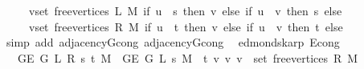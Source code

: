 \begin{isabellebody}
\ \ \ \ \ {\isacharparenleft}{\kern0pt}{\isasymUnion}v{\isasymin}set\ {\isacharparenleft}{\kern0pt}free{\isacharunderscore}{\kern0pt}vertices\ L\ M{\isacharparenright}{\kern0pt}{\isachardot}{\kern0pt}\ if\ u\ {\isacharequal}{\kern0pt}\ s\ then\ {\isacharbraceleft}{\kern0pt}v{\isacharbraceright}{\kern0pt}\ else\ if\ u\ {\isacharequal}{\kern0pt}\ v\ then\ {\isacharbraceleft}{\kern0pt}s{\isacharbraceright}{\kern0pt}\ else\ {\isacharbraceleft}{\kern0pt}{\isacharbraceright}{\kern0pt}{\isacharparenright}{\kern0pt}\ {\isasymunion}\isanewline
\ \ \ \ \ {\isacharparenleft}{\kern0pt}{\isasymUnion}v{\isasymin}set\ {\isacharparenleft}{\kern0pt}free{\isacharunderscore}{\kern0pt}vertices\ R\ M{\isacharparenright}{\kern0pt}{\isachardot}{\kern0pt}\ if\ u\ {\isacharequal}{\kern0pt}\ t\ then\ {\isacharbraceleft}{\kern0pt}v{\isacharbraceright}{\kern0pt}\ else\ if\ u\ {\isacharequal}{\kern0pt}\ v\ then\ {\isacharbraceleft}{\kern0pt}t{\isacharbraceright}{\kern0pt}\ else\ {\isacharbraceleft}{\kern0pt}{\isacharbraceright}{\kern0pt}{\isacharparenright}{\kern0pt}{\isachardoublequoteclose}%
\endisataginvisible
{\isafoldinvisible}%
%
\isadeliminvisible
\isanewline
%
\endisadeliminvisible
%
\isadelimproof
\ \ %
\endisadelimproof
%
\isatagproof
{}\isamarkupfalse%
\ {\isacharparenleft}{\kern0pt}simp\ add{\isacharcolon}{\kern0pt}\ adjacency{\isacharunderscore}{\kern0pt}G{}{\isacharunderscore}{\kern0pt}{}{\isacharunderscore}{\kern0pt}cong\ adjacency{\isacharunderscore}{\kern0pt}G{}{\isacharunderscore}{\kern0pt}{}{\isacharunderscore}{\kern0pt}cong{\isacharparenright}{\kern0pt}%
\endisatagproof
{\isafoldproof}%
%
\isadelimproof
\isanewline
%
\endisadelimproof
\isanewline
{}\isamarkupfalse%
\ {\isacharparenleft}{\kern0pt}\ edmonds{\isacharunderscore}{\kern0pt}karp{\isacharparenright}{\kern0pt}\ E{}{\isacharunderscore}{\kern0pt}{}{\isacharunderscore}{\kern0pt}cong{\isacharcolon}{\kern0pt}\isanewline
\ \ \ {\isachardoublequoteopen}G{\isachardot}{\kern0pt}E\ {\isacharparenleft}{\kern0pt}G{}{\isacharunderscore}{\kern0pt}{}\ L\ R\ s\ t\ M{\isacharparenright}{\kern0pt}\ {\isacharequal}{\kern0pt}\ G{\isachardot}{\kern0pt}E\ {\isacharparenleft}{\kern0pt}G{}{\isacharunderscore}{\kern0pt}{}\ L\ s\ M{\isacharparenright}{\kern0pt}\ {\isasymunion}\ {\isacharbraceleft}{\kern0pt}{\isacharbraceleft}{\kern0pt}t{\isacharcomma}{\kern0pt}\ v{\isacharbraceright}{\kern0pt}\ {\isacharbar}{\kern0pt}v{\isachardot}{\kern0pt}\ v\ {\isasymin}\ set\ {\isacharparenleft}{\kern0pt}free{\isacharunderscore}{\kern0pt}vertices\ R\ M{\isacharparenright}{\kern0pt}{\isacharbraceright}{\kern0pt}{\isachardoublequoteclose}\isanewline

\end{isabellebody}
